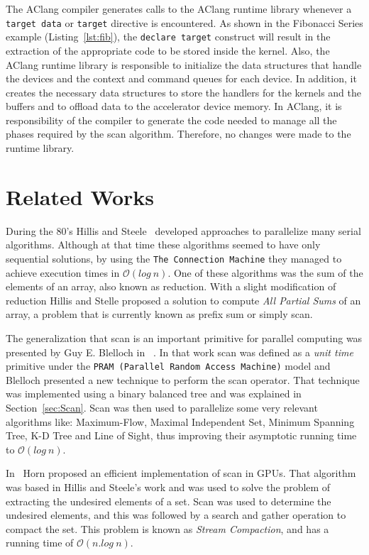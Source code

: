\documentclass[Ingles]{ic-tese-v1}
\newcommand{\rsec}[1]{Section~\ref{sec:#1}}
\newcommand{\ttt}[1]{{\texttt{#1}}}
\newcommand{\rlst}[1]{Listing~\ref{lst:#1}}
\begin{document}
The AClang compiler generates calls to  the AClang runtime library whenever a
\ttt{target data}  or \ttt{target}  directive is encountered.   As shown  in  the Fibonacci  
Series example (\rlst{fib}),  the \ttt{declare  target}
construct will result in the extraction  of the appropriate code to be
stored  inside  the  kernel.  Also,  the  AClang  runtime  library  is
responsible to initialize the data  structures that handle the devices
and the context  and command queues for each device.   In addition, it
creates the  necessary data structures  to store the handlers  for the
kernels and the buffers and to offload data to the accelerator device
memory.  In AClang, it is responsibility of the compiler to generate
the  code needed  to manage  all the  phases required by  the scan  algorithm.
Therefore, no changes were made to the runtime library.

\chapter{Related Works}
\label{cap:RelatedWorks}
During  the 80's  Hillis and  Steele~\cite{dataparallel} developed 
approaches to parallelize many serial  algorithms. Although at that time
these algorithms  seemed to have only  sequential solutions, by  using the
\ttt{The  Connection Machine}  \cite{themachine} they  managed to achieve
execution times in $\mathcal{O}(log\ n)$.  One of these algorithms was
the sum of  the elements of an  array, also known as  reduction.  With a
slight modification of reduction Hillis and Stelle proposed a solution
to compute \textit{All Partial Sums} of an array,  a problem that
is currently known as prefix sum or simply scan.

The generalization that scan is an important  primitive
for  parallel  computing  was  presented   by  Guy  E.   Blelloch  in
~\cite{ScanAsPrimitive}. In  that work scan was  defined as a
\textit{unit time}  primitive under the \texttt{PRAM  (Parallel Random
	Access Machine)}  model and  Blelloch presented  a new  technique to
perform  the scan  operator. That  technique was  implemented using  a
binary balanced tree  and was explained in  \rsec{Scan}.  Scan 
was  then used   to  parallelize   some  very  relevant   algorithms  like:
Maximum-Flow, Maximal Independent Set, Minimum Spanning Tree, K-D Tree
and Line  of Sight,  thus improving their  asymptotic running  time to
$\mathcal{O}(log\ n)$.

In~\cite{GPUGems2}  Horn  proposed  an  efficient
implementation of  scan in GPUs.   That algorithm was based  in Hillis
and Steele's work and was used  to solve the problem of extracting the
undesired elements  of a set.  Scan  was used to
determine  the undesired elements, and this was followed by a search
and  gather   operation  to   compact the set.  This   problem  is   known  as
\textit{Stream   Compaction},  and has a running  time   of
$\mathcal{O}(n.log\ n)$. 
\end{document}
